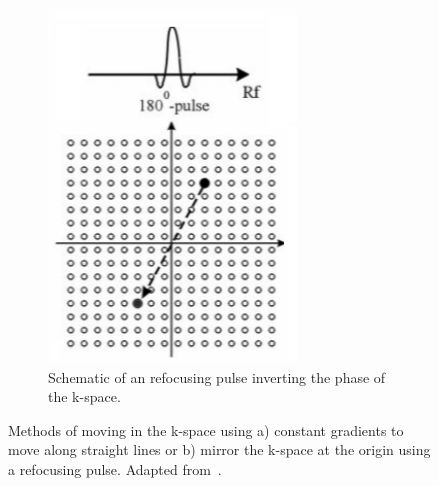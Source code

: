 \documentclass[english,version-2022-01]{uzl-thesis} %
\begin{document}
\begin{figure}[h]
\begin{subfigure}{0.445\textwidth}
    		\includegraphics[width=\textwidth]{refocusing_k-sapce_pulse.png}
    		\caption{Schematic of an refocusing pulse inverting the phase of the k-space.}
    		\label{fig:refocusing_k-sapce_pulse}
	\end{subfigure}
	\caption{Methods of moving in the k-space using a) constant gradients to move along straight lines or b) mirror the k-space at the origin using a refocusing pulse. Adapted from~\cite{SamplingStrategies}.}
	\label{fig:kSpaceTrajectories}
\end{figure}
\end{document}
